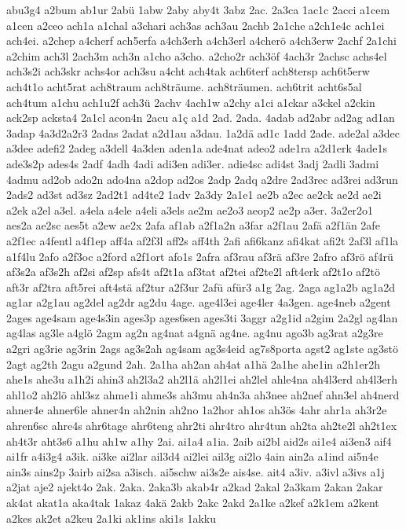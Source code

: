 {abu3g4
a2bum
ab1ur
2abü
1abw
2aby
aby4t
3abz
2ac.
2a3ca
1ac1c
2acci
a1cem
a1cen
a2ceo
ach1a
a1chal
a3chari
ach3as
ach3au
2achb
2a1che
a2ch1e4c
ach1ei
ach4ei.
a2chep
a4cherf
ach5erfa
a4ch3erh
a4ch3erl
a4cherö
a4ch3erw
2achf
2a1chi
a2chim
ach3l
2ach3m
ach3n
a1cho
a3cho.
a2cho2r
ach3öf
4ach3r
2achsc
achs4el
ach3s2i
ach3skr
achs4or
ach3su
a4cht
ach4tak
ach6terf
ach8tersp
ach6t5erw
ach4t1o
acht5rat
ach8traum
ach8träume.
ach8träumen.
ach6trit
acht6s5al
ach4tum
a1chu
ach1u2f
ach3ü
2achv
4ach1w
a2chy
a1ci
a1ckar
a3ckel
a2ckin
ack2sp
acksta4
2a1cl
acon4n
2acu
a1ç
a1d
2ad.
2ada.
4adab
ad2abr
ad2ag
ad1an
3adap
4a3d2a2r3
2adas
2adat
a2d1au
a3dau.
1a2dä
ad1c
1add
2ade.
ade2al
a3dec
a3dee
adefi2
2adeg
a3dell
4a3den
aden1a
ade4nat
adeo2
ade1ra
a2d1erk
4ade1s
ade3s2p
ades4s
2adf
4adh
4adi
adi3en
adi3er.
adie4sc
adi4st
3adj
2adli
3admi
4admu
ad2ob
ado2n
ado4na
a2dop
ad2os
2adp
2adq
a2dre
2ad3rec
ad3rei
ad3run
2ads2
ad3st
ad3sz
2ad2t1
ad4te2
1adv
2a3dy
2a1e1
ae2b
a2ec
ae2ck
ae2d
ae2i
a2ek
a2el
a3el.
a4ela
a4ele
a4eli
a3els
ae2m
ae2o3
aeop2
ae2p
a3er.
3a2er2o1
aes2a
ae2sc
aes5t
a2ew
ae2x
2afa
af1ab
a2f1a2n
a3far
a2f1au
2afä
a2f1än
2afe
a2f1ec
a4fentl
a4f1ep
aff4a
af2f3l
aff2s
aff4th
2afi
afi6kanz
afi4kat
afi2t
2af3l
af1la
a1f4lu
2afo
a2f3oc
a2ford
a2f1ort
afo1s
2afra
af3rau
af3rä
af3re
2afro
af3rö
af4rü
af3s2a
af3s2h
af2si
af2sp
afs4t
af2t1a
af3tat
af2tei
af2te2l
aft4erk
af2t1o
af2tö
aft3r
af2tra
aft5rei
aft4stä
af2tur
a2f3ur
2afü
afür3
a1g
2ag.
2aga
ag1a2b
ag1a2d
ag1ar
a2g1au
ag2del
ag2dr
ag2du
4age.
age4l3ei
age4ler
4a3gen.
age4neb
a2gent
2ages
age4sam
age4s3in
ages3p
ages6sen
ages3ti
3aggr
a2g1id
a2gim
2a2gl
ag4lan
ag4las
ag3le
a4glö
2agm
ag2n
ag4nat
a4gnä
ag4ne.
ag4nu
ago3b
ag3rat
a2g3re
a2gri
ag3rie
ag3rin
2ags
ag3s2ah
ag4sam
ag3s4eid
ag7s8porta
agst2
ag1ste
ag3stö
2agt
ag2th
2agu
a2gund
2ah.
2a1ha
ah2an
ah4at
a1hä
2a1he
ahe1in
a2h1er2h
ahe1s
ahe3u
a1h2i
ahin3
ah2l3a2
ah2l1ä
ah2l1ei
ah2lel
ahle4na
ah4l3erd
ah4l3erh
ahl1o2
ah2lö
ahl3sz
ahme1i
ahme3s
ah3mu
ah4n3a
ah3nee
ah2nef
ahn3el
ah4nerd
ahner4e
ahner6le
ahner4n
ah2nin
ah2no
1a2hor
ah1os
ah3ös
4ahr
ahr1a
ah3r2e
ahren6sc
ahre4s
ahr6tage
ahr6teng
ahr2ti
ahr4tro
ahr4tun
ah2ta
ah2te2l
ah2t1ex
ah4t3r
aht3s6
a1hu
ah1w
a1hy
2ai.
ai1a4
a1ia.
2aib
ai2bl
aid2s
ai1e4
ai3en3
aif4
ai1fr
a4i3g4
a3ik.
ai3ke
ai2lar
ail3d4
ai2lei
ail3g
ai2lo
4ain
ain2a
a1ind
ai5n4e
ain3s
ains2p
3airb
ai2sa
a3isch.
ai5schw
ai3s2e
ais4se.
ait4
a3iv.
a3ivl
a3ivs
a1j
a2jat
aje2
ajekt4o
2ak.
2aka.
2aka3b
akab4r
a2kad
2akal
2a3kam
2akan
2akar
ak4at
akat1a
aka4tak
1akaz
4akä
2akb
2akc
2akd
2a1ke
a2kef
a2k1em
a2kent
a2kes
ak2et
a2keu
2a1ki
ak1ins
aki1s
1akku
}
